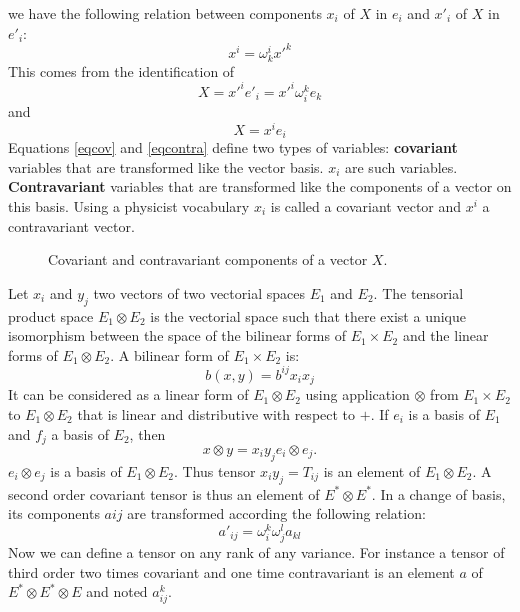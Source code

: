 \documentclass[12pt]{book}
\begin{document}
we have the following relation between components $x_i$
of $X$ in $e_i$ and $x'_i$ of $X$ in $e'_i$:
\begin{equation}\label{eqcontra}
x^i=\omega^i_kx'^k
\end{equation}
This comes from the identification of
\begin{equation}
X=x'^ie'_i=x'^i\omega^k_ie_k
\end{equation}
and
\begin{equation}
X=x^ie_i
\end{equation}
Equations \ref{eqcov} and \ref{eqcontra} define two types of variables:
{\bf covariant} variables that are transformed like the vector basis. $x_i$
are such 
variables. {\bf Contravariant} variables that are transformed like the
components of a vector on this basis.
Using a physicist vocabulary $x_i$ is called a covariant vector and $x^i$ a
contravariant vector.
\begin{figure}[htb]
 \centerline{}   
 \caption{Covariant and contravariant components of a vector $X$.} 
 \label{figcovcontra}
\end{figure}
Let $x_i$ and $y_j$ two vectors of two vectorial spaces $E_1$ and
$E_2$.
The tensorial product space $E_1\otimes E_2$ is the vectorial space
such that there exist a unique isomorphism between the space of the
bilinear forms of $E_1\times E_2$ and the linear forms of $E_1\otimes
E_2$.
A bilinear form of $E_1\times E_2$ is:
\begin{equation}
b(x,y)=b^{ij}x_ix_j
\end{equation}
It can be considered as a linear form of $E_1\otimes E_2$ using
application $\otimes$ from $E_1\times E_2$ to $E_1\otimes E_2$ that is
linear and distributive with respect to $+$. If $e_i$ is a basis of
$E_1$ and $f_j$ a basis of $E_2$, then
\begin{equation}
x\otimes y=x_iy_j e_i\otimes e_j.
\end{equation}
$e_i\otimes e_j$ is a basis of $E_1\otimes E_2$.
Thus tensor $x_iy_j=T_{ij}$ is an element of $E_1\otimes E_2$.
A second order covariant tensor is thus an element of $E^*\otimes E^*$.
In a change of basis, its components $a{ij}$ are transformed according the
following relation:
\begin{equation}
a'_{ij}=\omega^k_i\omega^l_j a_{kl}
\end{equation}
Now we can define a tensor on any rank of any variance. For instance a tensor
of third order two times covariant and one time contravariant is an element
$a$ of $E^*\otimes E^*\otimes E$ and noted $a_{ij}^k$.
\end{document}
